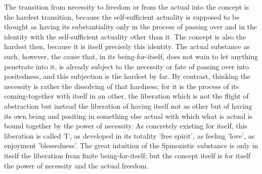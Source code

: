     The transition from necessity to freedom or
    from the actual into the concept is the hardest transition,
    because the self-sufficient actuality is supposed to be thought
    as having its substantiality only in the process of passing over and
    in the identity with the self-sufficient actuality other than it.
    The concept is also the hardest then,
    because it is itself precisely this identity.
    The actual substance as such, however,
    the cause that, in its being-for-itself,
    does not wain to let anything penetrate into it,
    is already subject to the necessity or fate
    of passing over into positedness,
    and this subjection is the hardest by far.
    By contrast, thinking the necessity is
    rather the dissolving of that hardness;
    for it is the process of its
    coming-together with itself in an other,
    the liberation which is not the flight of abstraction
    but instead the liberation of having itself
    not as other but of having its own being and positing
    in something else actual with which what is actual is
    bound together by the power of necessity.
    As concretely existing for itself,
    this liberation is called 'I',
    as developed in its totality 'free spirit',
    as feeling 'love', as enjoyment 'blessedness'.
    The great intuition of the Spinozistic substance is
    only in itself the liberation from finite being-for-itself;
    but the concept itself is for itself
    the power of necessity and the actual freedom.
